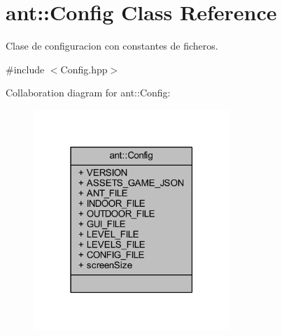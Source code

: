 \hypertarget{classant_1_1_config}{\section{ant\+:\+:Config Class Reference}
\label{classant_1_1_config}
}


Clase de configuracion con constantes de ficheros.  




{\ttfamily \#include $<$Config.\+hpp$>$}



Collaboration diagram for ant\+:\+:Config\+:
\nopagebreak
\begin{figure}[H]
\begin{center}
\leavevmode
\includegraphics[width=210pt]{d1/d37/classant_1_1_config__coll__graph}
\end{center}
\end{figure}
